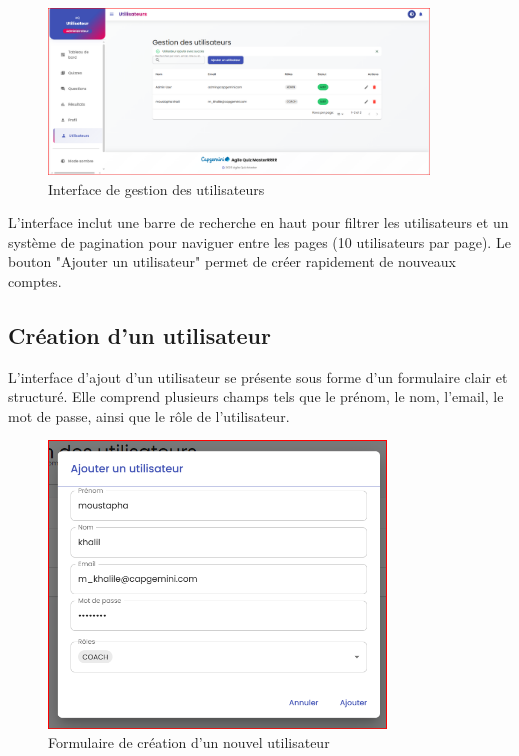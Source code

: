 \documentclass[12pt,a4paper]{report}
\begin{document}
\begin{figure}[H]
\centering
\includegraphics[width=0.9\textwidth]{latex_media/media/image53.png}
\caption{Interface de gestion des utilisateurs}
\label{fig:gestion-utilisateurs}
\end{figure}

L'interface inclut une barre de recherche en haut pour filtrer les utilisateurs et un système de pagination pour naviguer entre les pages (10 utilisateurs par page). Le bouton "Ajouter un utilisateur" permet de créer rapidement de nouveaux comptes.

\subsection{Création d'un utilisateur}

L'interface d'ajout d'un utilisateur se présente sous forme d'un formulaire clair et structuré. Elle comprend plusieurs champs tels que le prénom, le nom, l'email, le mot de passe, ainsi que le rôle de l'utilisateur.

\begin{figure}[H]
\centering
\includegraphics[width=0.8\textwidth]{latex_media/media/image54.png}
\caption{Formulaire de création d'un nouvel utilisateur}
\label{fig:creation-utilisateur}
\end{figure}
\end{document}
